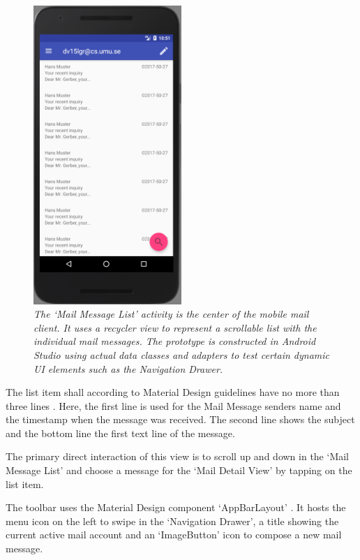 \documentclass[a4paper,11pt,twoside]{article}
\begin{document}
\begin{figure}[hp!]

  \centering
    \includegraphics[width=0.5\textwidth]{mail_message_list}
    \caption{\textit{The `Mail Message List' activity is the center of the
    mobile mail client. It uses a recycler view to represent a scrollable
    list with the individual mail messages. The prototype is constructed
    in Android Studio using actual data classes and adapters to test
    certain dynamic UI elements such as the Navigation Drawer.}}
    \label{fig:mail_message_list}
\end{figure}

The list item shall according to Material Design guidelines have no more
than  three lines \cite{material_lists}. Here, the first line is used for the
Mail Message senders name and the timestamp when the message was received. The
second line shows the subject and the bottom line the first text line of the
message.

The primary direct interaction of this view is to scroll up and down in the
`Mail Message List' and choose a message for the `Mail Detail View' by tapping
on the list item.

The toolbar uses the Material Design component `AppBarLayout'
\cite{appbar_layout}. It hosts the menu icon on the left to swipe in the
`Navigation Drawer', a title showing the current active mail account and an
`ImageButton' icon to compose a new mail message.
\end{document}
